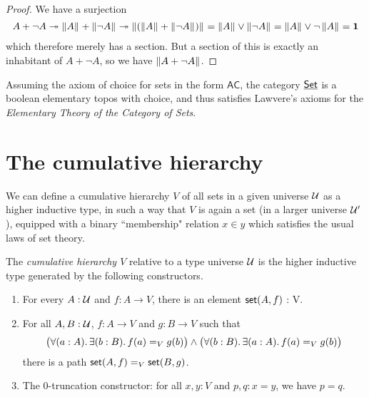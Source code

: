 \begin{proof}
  We have a surjection
\[
A + \neg A \epi \brck{A} + \brck{\neg A} \epi \brck{(\brck{A} + \brck{\neg A})} = \brck{A} \vee \brck{\neg A} = \brck{A} \vee \neg \brck A = \unit
\]
which therefore merely has a section.
But a section of this is exactly an inhabitant of $A+\neg A$, so we have $\brck{A+\neg A}$.
\end{proof}

\begin{thm}\label{thm:ETCS} Assuming the axiom of choice for sets in the form $\mathsf{AC}$, the category $\uset$ is a boolean elementary topos with choice, and thus satisfies Lawvere's axioms for the \emph{Elementary Theory of the Category of Sets}.
 \end{thm}




\section{The cumulative hierarchy}
\label{sec:cumulative-hierarchy}

We can define a cumulative hierarchy $V$ of all sets in a given universe $\UU$ as a higher inductive type, in such a way that $V$ is again a set (in a larger universe $\UU'$), equipped with a binary ``membership" relation $x\in y$ which satisfies the usual laws of set theory.

\begin{defn}
  The \emph{cumulative hierarchy $V$} relative to a type universe $\UU$ is the
  higher inductive type generated by the following constructors.
  \begin{enumerate}
  \item For every $A : \UU$ and $f : A \to V$, there is an element $\vset(A, f)$ : V.
  \item For all $A, B : \UU$, $f : A \to V$ and $g : B \to V$ such that
    \begin{equation} \label{eq:V-path}
      \big(\fall{a:A} \exis{b:B} \id[V]{f(a)}{g(b)}\big) \land \big(\fall{b:B} \exis{a:A} \id[V]{f(a)}{g(b)}\big)
    \end{equation}
    there is a path $\id[V]{\vset(A,f)}{\vset(B,g)}$.
  \item The 0-truncation constructor: for all $x,y:V$ and $p,q:x=y$, we have $p=q$.
  \end{enumerate}
\end{defn}

